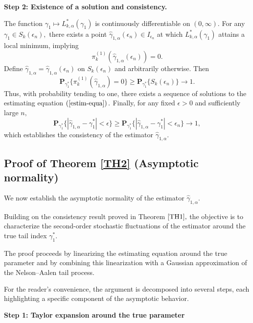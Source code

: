 \documentclass[reqno,openbib,runningheads,a4paper,12pt]{amsart}%
\begin{document}
\noindent\textbf{Step 2: Existence of a solution and consistency.}\smallskip

\noindent The function $\gamma_{1}\mapsto L_{k,\alpha}^{\ast}(\gamma_{1})$ is
continuously differentiable on $(0,\infty).$ For any $\gamma_{1}\in
S_{k}(\epsilon_{n}),$ there exists a point $\widehat{\gamma}_{1,\alpha
}(\epsilon_{n})\in I_{\epsilon_{n}}$ at which $L_{k,\alpha}^{\ast}(\gamma
_{1})$ attains a local minimum, implying
\[
\pi_{k}^{(1)}(\widehat{\gamma}_{1,\alpha}(\epsilon_{n}))=0.
\]
Define $\widehat{\gamma}_{1,\alpha}=\widehat{\gamma}_{1,\alpha}(\epsilon_{n})$
on $S_{k}(\epsilon_{n})$ and arbitrarily otherwise. Then
\[
\mathbf{P}_{\gamma_{1}^{\ast}}\{\pi_{k}^{(1)}(\widehat{\gamma}_{1,\alpha
})=0\}\geq\mathbf{P}_{\gamma_{1}^{\ast}}\{S_{k}(\epsilon_{n})\}\rightarrow1.
\]
Thus, with probability tending to one, there exists a sequence of solutions to
the estimating equation $\left(  \ref{estim-equa}\right)  .$ Finally, for any
fixed $\epsilon>0$ and sufficiently large $n,$
\[
\mathbf{P}_{\gamma_{1}^{\ast}}\{|\widehat{\gamma}_{1,\alpha}-\gamma_{1}^{\ast
}|<\epsilon\}\geq\mathbf{P}_{\gamma_{1}^{\ast}}\{|\widehat{\gamma}_{1,\alpha
}-\gamma_{1}^{\ast}|<\epsilon_{n}\}\rightarrow1,
\]
which establishes the consistency of the estimator $\widehat{\gamma}%
_{1,\alpha}.$

\subsection{Proof of Theorem \ref{TH2} (Asymptotic normality)}

\noindent We now establish the asymptotic normality of the estimator
$\widehat{\gamma}_{1,\alpha}.$\textbf{\smallskip}

\noindent Building on the consistency result proved in Theorem $\ref{TH1},$
the objective is to characterize the second-order stochastic fluctuations of
the estimator around the true tail index $\gamma_{1}^{\ast}.$%
\textbf{\smallskip}

\noindent The proof proceeds by linearizing the estimating equation around the
true parameter and by combining this linearization with a Gaussian
approximation of the Nelson--Aalen tail process.\textbf{\smallskip}

\noindent For the reader's convenience, the argument is decomposed into
several steps, each highlighting a specific component of the asymptotic
behavior.\medskip

\noindent\textbf{Step 1: Taylor expansion around the true parameter\medskip}
\end{document}

